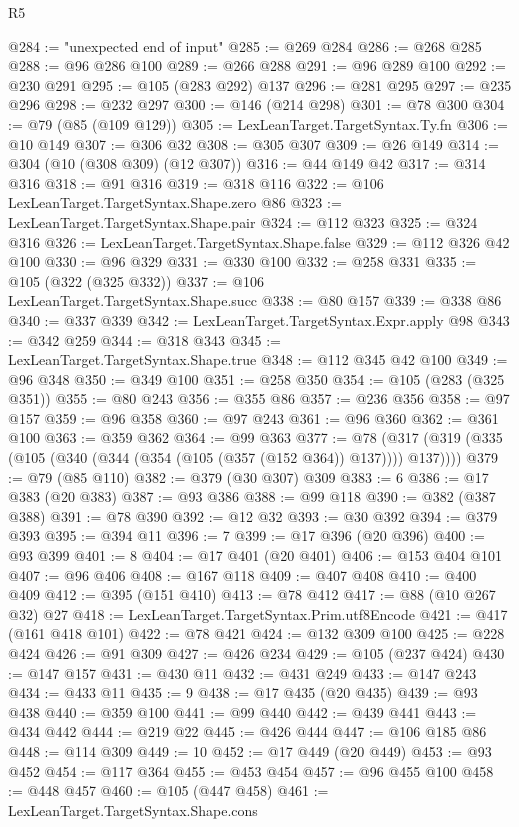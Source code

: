 \begin{lexlean}{R5}
\begin{coremodule}
@284 := "unexpected end of input"
@285 := @269 @284
@286 := @268 @285
@288 := @96 @286 @100
@289 := @266 @288
@291 := @96 @289 @100
@292 := @230 @291
@295 := @105 (@283 @292) @137
@296 := @281 @295
@297 := @235 @296
@298 := @232 @297
@300 := @146 (@214 @298)
@301 := @78 @300
@304 := @79 (@85 (@109 @129))
@305 := LexLeanTarget.TargetSyntax.Ty.fn
@306 := @10 @149
@307 := @306 @32
@308 := @305 @307
@309 := @26 @149
@314 := @304 (@10 (@308 @309) (@12 @307))
@316 := @44 @149 @42
@317 := @314 @316
@318 := @91 @316
@319 := @318 @116
@322 := @106 LexLeanTarget.TargetSyntax.Shape.zero @86
@323 := LexLeanTarget.TargetSyntax.Shape.pair
@324 := @112 @323
@325 := @324 @316
@326 := LexLeanTarget.TargetSyntax.Shape.false
@329 := @112 @326 @42 @100
@330 := @96 @329
@331 := @330 @100
@332 := @258 @331
@335 := @105 (@322 (@325 @332))
@337 := @106 LexLeanTarget.TargetSyntax.Shape.succ
@338 := @80 @157
@339 := @338 @86
@340 := @337 @339
@342 := LexLeanTarget.TargetSyntax.Expr.apply @98
@343 := @342 @259
@344 := @318 @343
@345 := LexLeanTarget.TargetSyntax.Shape.true
@348 := @112 @345 @42 @100
@349 := @96 @348
@350 := @349 @100
@351 := @258 @350
@354 := @105 (@283 (@325 @351))
@355 := @80 @243
@356 := @355 @86
@357 := @236 @356
@358 := @97 @157
@359 := @96 @358
@360 := @97 @243
@361 := @96 @360
@362 := @361 @100
@363 := @359 @362
@364 := @99 @363
@377 := @78 (@317 (@319 (@335 (@105 (@340 (@344 (@354 (@105 (@357 (@152 @364)) @137)))) @137))))
@379 := @79 (@85 @110)
@382 := @379 (@30 @307) @309
@383 := 6
@386 := @17 @383 (@20 @383)
@387 := @93 @386
@388 := @99 @118
@390 := @382 (@387 @388)
@391 := @78 @390
@392 := @12 @32
@393 := @30 @392
@394 := @379 @393
@395 := @394 @11
@396 := 7
@399 := @17 @396 (@20 @396)
@400 := @93 @399
@401 := 8
@404 := @17 @401 (@20 @401)
@406 := @153 @404 @101
@407 := @96 @406
@408 := @167 @118
@409 := @407 @408
@410 := @400 @409
@412 := @395 (@151 @410)
@413 := @78 @412
@417 := @88 (@10 @267 @32) @27
@418 := LexLeanTarget.TargetSyntax.Prim.utf8Encode
@421 := @417 (@161 @418 @101)
@422 := @78 @421
@424 := @132 @309 @100
@425 := @228 @424
@426 := @91 @309
@427 := @426 @234
@429 := @105 (@237 @424)
@430 := @147 @157
@431 := @430 @11
@432 := @431 @249
@433 := @147 @243
@434 := @433 @11
@435 := 9
@438 := @17 @435 (@20 @435)
@439 := @93 @438
@440 := @359 @100
@441 := @99 @440
@442 := @439 @441
@443 := @434 @442
@444 := @219 @22
@445 := @426 @444
@447 := @106 @185 @86
@448 := @114 @309
@449 := 10
@452 := @17 @449 (@20 @449)
@453 := @93 @452
@454 := @117 @364
@455 := @453 @454
@457 := @96 @455 @100
@458 := @448 @457
@460 := @105 (@447 @458)
@461 := LexLeanTarget.TargetSyntax.Shape.cons

\end{coremodule}
\end{lexlean}
